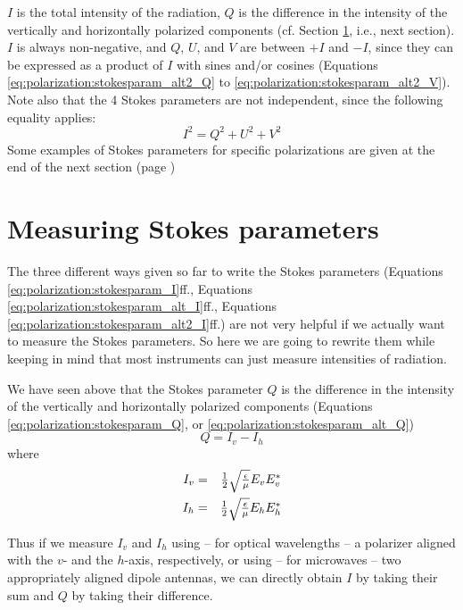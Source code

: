 $I$ is the total intensity of the radiation, 
$Q$ is the difference in the intensity of the vertically and
horizontally polarized components
(cf. Section \ref{sec:polarization:measuring}, i.e., next section).
$I$ is always non-negative, and $Q$, $U$, and $V$ are between $+I$ and $-I$,
since they can be expressed as a product of $I$ with sines and/or
cosines
(Equations \ref{eq:polarization:stokesparam_alt2_Q} to
\ref{eq:polarization:stokesparam_alt2_V}). 
Note also that the 4 Stokes parameters are not independent, since the
following equality applies:
\begin{equation}
  \label{eq:polarization:Isquare}
  I^2 = Q^2 + U^2 + V^2
\end{equation}
Some examples of Stokes parameters for specific polarizations are given
at the end of the next section (page \pageref{stokes-examples})
\section{Measuring Stokes parameters}
\label{sec:polarization:measuring}
The three different ways given so far to write the Stokes parameters
(Equations \ref{eq:polarization:stokesparam_I}ff.,
Equations \ref{eq:polarization:stokesparam_alt_I}ff.,
Equations \ref{eq:polarization:stokesparam_alt2_I}ff.)  are not very
helpful if we actually want to measure the Stokes parameters. So here
we are going to rewrite them while keeping in mind that most
instruments can just measure intensities of radiation.

We have seen above that the Stokes parameter $Q$ is the difference in
the intensity of the vertically and horizontally polarized components 
(Equations \ref{eq:polarization:stokesparam_Q},
or \ref{eq:polarization:stokesparam_alt_Q})
\begin{equation}
  \label{eq:polarization:Q_Idiff}
  Q = I_v - I_h
\end{equation}
where
\begin{eqnarray}
  \label{eq:polarization:Iv}
  I_v &=&  \textstyle\frac{1}{2}\sqrt{\textstyle{\frac{\epsilon}{\mu}}} E_v E_v^\ast\\
  \label{eq:polarization:Ih}
  I_h &=&  \textstyle\frac{1}{2}\sqrt{\textstyle{\frac{\epsilon}{\mu}}} E_h E_h^\ast
\end{eqnarray}
  
Thus if we measure $I_v$ and $I_h$ using -- for optical wavelengths --
a polarizer aligned with the $v$- and the $h$-axis, respectively, or
using -- for microwaves -- two appropriately aligned dipole antennas, we
can directly obtain $I$ by taking their sum and $Q$ by taking their
difference.

